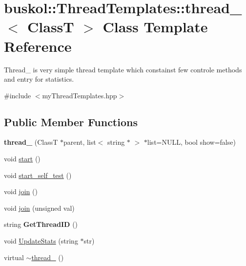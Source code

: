 \hypertarget{classbuskol_1_1ThreadTemplates_1_1thread__1}{
\section{buskol::ThreadTemplates::thread\_$<$ ClassT $>$ Class Template Reference}
\label{classbuskol_1_1ThreadTemplates_1_1thread__1}
}


Thread\_ is very simple thread template which constainst few controle methods and entry for statistics.  




{\ttfamily \#include $<$myThreadTemplates.hpp$>$}

\subsection*{Public Member Functions}
\begin{DoxyCompactItemize}
\item 
\hypertarget{classbuskol_1_1ThreadTemplates_1_1thread__1_abb320f878a938843b4d797300a2e4703}{
{\bfseries thread\_} (ClassT $\ast$parent, list$<$ string $\ast$ $>$ $\ast$list=NULL, bool show=false)}
\label{classbuskol_1_1ThreadTemplates_1_1thread__1_abb320f878a938843b4d797300a2e4703}

\item 
void \hyperlink{classbuskol_1_1ThreadTemplates_1_1thread__1_a71250f676aa96d06d5b693b685af7555}{start} ()
\item 
void \hyperlink{classbuskol_1_1ThreadTemplates_1_1thread__1_ad3a839cb3ec07abf8cf54fe81fd5e7f3}{start\_\-self\_\-test} ()
\item 
void \hyperlink{classbuskol_1_1ThreadTemplates_1_1thread__1_af917523b30feb06614e96371a5c198ed}{join} ()
\item 
void \hyperlink{classbuskol_1_1ThreadTemplates_1_1thread__1_a7c62551333aad740fc7b48742cdeb877}{join} (unsigned val)
\item 
\hypertarget{classbuskol_1_1ThreadTemplates_1_1thread__1_a86326c7ac7bc204899f806510d9060e7}{
string {\bfseries GetThreadID} ()}
\label{classbuskol_1_1ThreadTemplates_1_1thread__1_a86326c7ac7bc204899f806510d9060e7}

\item 
void \hyperlink{classbuskol_1_1ThreadTemplates_1_1thread__1_ab97928f6c8b8c75b33ffd6e57514d692}{UpdateStats} (string $\ast$str)
\item 
virtual \hyperlink{classbuskol_1_1ThreadTemplates_1_1thread__1_a7e53c5d7bef0898efc1c1bb217c6319a}{$\sim$thread\_} ()
\end{DoxyCompactItemize}
